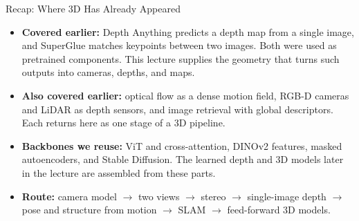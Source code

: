 \begin{frame}{Recap: Where 3D Has Already Appeared}
  \begin{itemize}\itemsep0.3em
    \item \textbf{Covered earlier:} Depth Anything predicts a depth map from a single image, and SuperGlue matches keypoints between two images. Both were used as pretrained components. This lecture supplies the geometry that turns such outputs into cameras, depths, and maps.
    \item \textbf{Also covered earlier:} optical flow as a dense motion field, RGB-D cameras and LiDAR as depth sensors, and image retrieval with global descriptors. Each returns here as one stage of a 3D pipeline.
    \item \textbf{Backbones we reuse:} ViT and cross-attention, DINOv2 features, masked autoencoders, and Stable Diffusion. The learned depth and 3D models later in the lecture are assembled from these parts.
    \item \textbf{Route:} camera model $\rightarrow$ two views $\rightarrow$ stereo $\rightarrow$ single-image depth $\rightarrow$ pose and structure from motion $\rightarrow$ SLAM $\rightarrow$ feed-forward 3D models.
  \end{itemize}
\end{frame}
